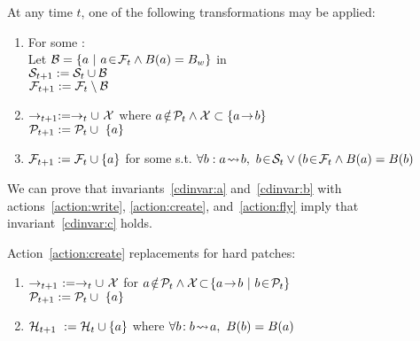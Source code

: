 \noindent At any time $t$, one of the following transformations may be applied:
\begin{enumerate}
\item For some :\\
Let \(\pset{B} = \{a\ |\ \inset{a}{\psetinflight{t}} \land \blockof{a} = \block{w} \}\) in\\
\(\mathcal{S}_{t+1} := \mathcal{S}_{t} \cup \mathcal{B}\)\\
\(\mathcal{F}_{t+1} := \mathcal{F}_{t} \setminus \mathcal{B}\)
\label{action:write}

\item \(\deps{t+1} := \deps{t} \cup\ \pset{X}\) where
\(a\! \notin\! \mathcal{P}_{t} \land \mathcal{X} \subset \{a\! \rightarrow\! b\}\)\\
\(\psetall{t+1} := \psetall{t} \cup\ \{a\}\)
\label{action:create}

\item \(\mathcal{F}_{t+1} := \mathcal{F}_{t} \cup \{a\}\) for some
 s.t. \(\forall b: a\! \leadsto\! b,\
b\! \in\! \mathcal{S}_{t} \lor (b\! \in\! \mathcal{F}_{t} \land
B(a) = B(b)\)
\label{action:fly}
\end{enumerate}

We can prove that invariants~\ref{cdinvar:a} and~\ref{cdinvar:b}
with actions~\ref{action:write}, \ref{action:create}, and~\ref{action:fly}
imply that invariant~\ref{cdinvar:c} holds.

\noindent Action~\ref{action:create} replacements for hard patches:
\begin{enumerate}
\item \(\deps{t+1}\ := \deps{t} \cup\ \pset{X}\) for
\(\notinset{a}{\psetall{t}} \land \pset{X}\! \subset\!
\{\depends{a}{b}\ |\ \inset{b}{\psetall{t}}\}\)\\
\(\psetall{t+1} := \psetall{t} \cup\ \{a\}\)

\item \(\mathcal{H}_{t+1}\ := \mathcal{H}_{t} \cup \{a\}\) where \(\forall b\!:
b\! \leadsto\! a,\ B(b) = B(a)\)
\end{enumerate}

